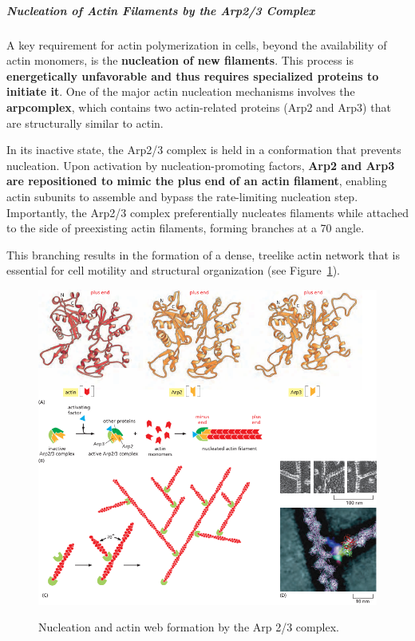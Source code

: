\documentclass[../main.tex]{subfiles}
\begin{document}
\subparagraph{Nucleation of Actin Filaments by the Arp2/3 Complex}
A key requirement for actin polymerization in cells, beyond the availability of actin monomers, is the \textbf{nucleation of new filaments}. This process is \textbf{energetically unfavorable and thus requires specialized proteins to initiate it}. One of the major actin nucleation mechanisms involves the \textbf{\gls{arpcomplex}}, which contains two actin-related proteins (Arp2 and Arp3) that are structurally similar to actin.

In its inactive state, the Arp2/3 complex is held in a conformation that prevents nucleation. Upon activation by nucleation-promoting factors, \textbf{Arp2 and Arp3 are repositioned to mimic the plus end of an actin filament}, enabling actin subunits to assemble and bypass the rate-limiting nucleation step. Importantly, the Arp2/3 complex preferentially nucleates filaments while attached to the side of preexisting actin filaments, forming branches at a 70\textdegree{} angle. 

This branching results in the formation of a dense, treelike actin network that is essential for cell motility and structural organization (see Figure~\ref{fig:arp2-3-nucleation}).

\begin{figure}[H]
	\centering
	\includegraphics[width = 0.7 \textwidth]{10}
	\label{fig:arp2-3-nucleation}
	\caption{Nucleation and actin web formation by the Arp 2/3 complex.}
\end{figure}
\end{document}
